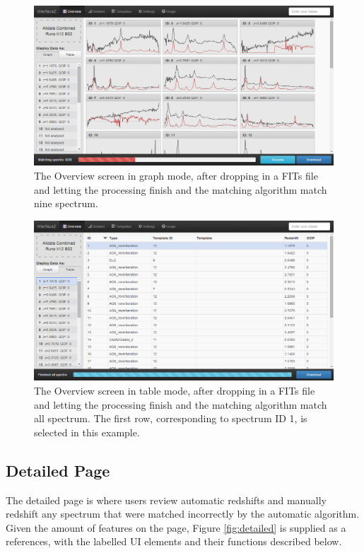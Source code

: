 \documentclass[titlesmallcaps, examinerscopy, copyrightpage]{uqthesis}
\begin{document}
\begin{figure}[ht!]
\includegraphics[width=1\textwidth]{images/overviewGraph.png} 
\centering
\caption{The Overview screen in graph mode, after dropping in a FITs file and letting the processing finish and the matching algorithm match nine spectrum.}
\label{fig:overviewGraph}
\end{figure}

\begin{figure}[ht!]
\includegraphics[width=1\textwidth]{images/overviewTable.png} 
\centering
\caption{The Overview screen in table mode, after dropping in a FITs file and letting the processing finish and the matching algorithm match all spectrum. The first row, corresponding to spectrum ID 1, is selected in this example.}
\label{fig:overviewTable}
\end{figure}





\subsection{Detailed Page}

The detailed page is where users review automatic redshifts and manually redshift any spectrum that were matched incorrectly by the automatic algorithm. Given the amount of features on the page, Figure \ref{fig:detailed} is supplied as a references, with the labelled UI elements and their functions described below.
\end{document}
